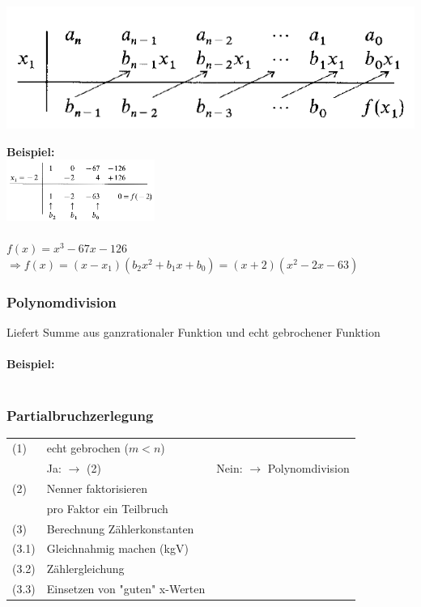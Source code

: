 			\includegraphics[width=0.7\linewidth]{Bilder/hornerschema_allg}
					

			\textbf{Beispiel:}\\
			\includegraphics[height=2cm]{Bilder/hornerschema_bsp} \\
			\\
			$f(x) = x^3-67x-126$\\
			$\Rightarrow f(x) = (x-x_1)(b_2x^2 + b_1x + b_0) = (x+2)(x^2-2x-63)$ 
			
			
			\subsubsection{Polynomdivision}
			Liefert Summe aus ganzrationaler Funktion und echt gebrochener Funktion\\
			\\
			\textbf{Beispiel:}\\
			\vspace{-5pt}  \\
			
			
			\subsubsection{Partialbruchzerlegung}
			\begin{tabular}{lll}
			(1) & echt gebrochen ($m < n$) & \\
			 &  Ja: $\rightarrow$ (2) & Nein: $\rightarrow$ Polynomdivision \\
			(2) & Nenner faktorisieren & \\
			 & pro Faktor ein Teilbruch & \\
			(3) & Berechnung Zählerkonstanten & \\
			(3.1) & Gleichnahmig machen (kgV) & \\
			(3.2) & Zählergleichung &\\
			(3.3) & Einsetzen von "guten"  x-Werten &\\			
			\end{tabular}
			
